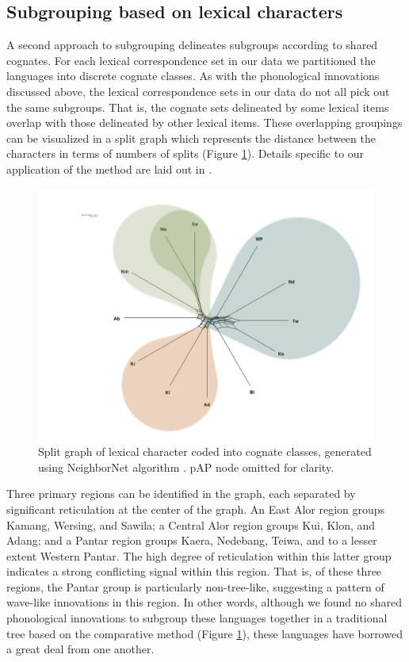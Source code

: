 \subsection{ Subgrouping based on lexical characters}
A second approach to subgrouping delineates subgroups according to shared cognates. For each lexical correspondence set in our data we partitioned the languages into discrete cognate classes. As with the phonological innovations discussed above, the lexical correspondence sets in our data do not all pick out the same subgroups. That is, the cognate sets delineated by some lexical items overlap with those delineated by other lexical items. These overlapping groupings can be visualized in a split graph which represents the distance between the characters in terms of numbers of splits (Figure \ref{fig:2:split_graph}). Details specific to our application of the method are laid out in \citet{RobinsonEtAl2012internal}.

\begin{figure}\centering
\includegraphics[width=\textwidth]{figures/Ch2HoltonRobinsonAPhistoryMKprooftmp-img3.jpg}
\caption{Split graph of lexical character coded into cognate classes, generated using NeighborNet algorithm  \citep{HusonEtAl2006}. pAP node omitted for clarity.}
\label{fig:2:split_graph}
\end{figure}

Three primary regions can be identified in the graph, each separated by significant reticulation at the center of the graph. An East Alor region groups Kamang, Wersing, and Sawila; a Central Alor region groups Kui, Klon, and Adang; and a Pantar region groups Kaera, Nedebang, Teiwa, and to a lesser extent Western Pantar. The high degree of reticulation within this latter group indicates a strong conflicting signal within this region. That is, of these three regions, the Pantar group is particularly non-tree-like, suggesting a pattern of wave-like innovations in this region. In other words, although we found no shared phonological innovations to subgroup these languages together in a traditional tree based on the comparative method (Figure \ref{fig:2:split_graph}), these languages have borrowed a great deal from one another. 

